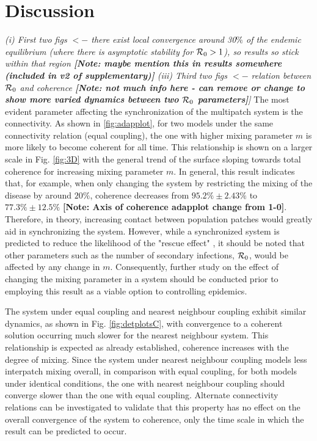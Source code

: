 \documentclass[twocolumn,nofootinbib,showkeys,twoside,floatfix,unsortedaddress,flushbottom,10pt,aps,pra]{report}
\begin{document}
\section{Discussion} 
\textit{(i) First two figs $<-$ there exist local convergence around 30$\%$ of the endemic equilibrium (where there is asymptotic stability for ${\cal R}_0 > 1$), so results so stick within that region \textbf{[Note: maybe mention this in results somewhere (included in v2 of supplementary)]}
(iii) Third two figs $<-$ relation between ${\cal R}_0$ and coherence \textbf{[Note: not much info here - can remove or change to show more varied dynamics between two ${\cal R}_0$ parameters]}]}
\bigskip
The most evident parameter affecting the synchronization of the multipatch system is the connectivity. As shown in \ref{fig:adapplot}, for two models under the same connectivity relation (equal coupling), the one with higher mixing parameter $m$ is more likely to become coherent for all time. This relationship is shown on a larger scale in Fig. \ref{fig:3D} with the general trend of the surface sloping towards total coherence for increasing mixing parameter $m$. In general, this result indicates that, for example, when only changing the system by restricting the mixing of the disease by around $20\%$, coherence decreases from $95.2\%\pm2.43\%$ to $77.3\%\pm12.5\%$ \textbf{[Note: Axis of coherence adapplot change from 1-0]}. Therefore, in theory, increasing contact between population patches would greatly aid in synchronizing the system. However, while a synchronized system is predicted to reduce the likelihood of the "rescue effect" \cite{Earn2000}, it should be noted that other parameters such as the number of secondary infections, ${\cal R}_0$, would be affected by any change in $m$. Consequently, further study on the effect of changing the mixing parameter in a system should be conducted prior to employing this result as a viable option to controlling epidemics. \par \smallskip \qquad
The system under equal coupling and nearest neighbour coupling exhibit similar dynamics, as shown in Fig. \ref{fig:detplotsC}, with convergence to a coherent solution occurring much slower for the nearest neighbour system. This relationship is expected as already established, coherence increases with the degree of mixing. Since the system under nearest neighbour coupling models less interpatch mixing overall, in comparison with equal coupling, for both models under identical conditions, the one with nearest neighbour coupling should converge slower than the one with equal coupling. Alternate connectivity relations can be investigated to validate that this property has no effect on the overall convergence of the system to coherence, only the time scale in which the result can be predicted to occur. \par \smallskip \qquad
\end{document}
